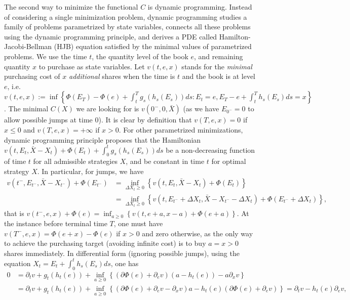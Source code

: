 \documentclass[openany,oneside]{article}
\theoremstyle{definition}
\theoremstyle{remark}
\begin{document}
The second way to minimize the functional $C$ is dynamic programming. Instead of considering a single minimization problem, dynamic programming studies a family of problems parametrized by state variables, connects all these problems using the dynamic programming principle, and derives a PDE called Hamilton-Jacobi-Bellman (HJB) equation satisfied by the minimal values of parametrized problems. We use the time $t$, the quantity level of the book $e$, and remaining quantity $x$ to purchase as state variables. Let $v(t,e,x)$ stands for the \emph{minimal} purchasing cost of $x$ \emph{additional} shares when the time is $t$ and the book is at level $e$, i.e. $v(t,e,x) := \inf \left\{ \Phi(E_T) - \Phi(e) + \int_t^T g_s(h_s(E_s)) ds : E_{t} = e, E_T - e + \int_t^T h_s(E_s) ds = x \right\}$. The minimal $C(X)$ we are looking for is $v({0^-},0,\bar{X})$ (as we have $E_{0^-}=0$ to allow possible jumps at time $0$). It is clear by definition that $v(T,e,x)=0$ if $x\le 0$ and $v(T,e,x)=+\infty$ if $x>0$. For other parametrized minimizations, dynamic programming principle proposes that the Hamiltonian $v(t,E_{t},\bar{X}-X_{t}) + \Phi(E_{t}) + \int_0^t g_s(h_s(E_s)) ds$ be a non-decreasing function of time $t$ for all admissible strategies $X$, and be constant in time $t$ for optimal strategy $X$. In particular, for jumps, we have 
\begin{align*}
v(t^-, E_{t^-}, \bar{X}-X_{t^-}) + \Phi(E_{t^-}) &= \inf_{\Delta X_t \ge 0} \left\{ v(t,E_t,\bar{X}-X_t) + \Phi(E_t) \right\} \\
&= \inf_{\Delta X_t \ge 0} \left\{ v(t, E_{t^-}+\Delta X_t, \bar{X}-X_{t^-}-\Delta X_t) + \Phi(E_{t^-} + \Delta X_t) \right\},
\end{align*}
that is $v(t^-,e,x) + \Phi(e) = \inf_{a\ge 0} \left\{v(t,e+a,x-a) + \Phi(e+a) \right\}$. At the instance before terminal time $T$, one must have $v(T^-,e,x)=\Phi(e+x)-\Phi(e)$ if $x>0$ and zero otherwise, as the only way to achieve the purchasing target (avoiding infinite cost) is to buy $a=x>0$ shares immediately. In differential form (ignoring possible jumps), using the equation $X_t = E_t + \int_0^t h_s(E_s) ds$, one has
\begin{align*}
0 &= \partial_t v + g_t(h_t(e)) + \inf_{a\ge 0} \left\{ (\partial \Phi(e) + \partial_e v) (a-h_t(e)) - a \partial_x v \right\} \\
&= \partial_t v + g_t(h_t(e)) + \inf_{a\ge 0} \left\{ (\partial \Phi(e) + \partial_e v - \partial_x v) a - h_t(e) (\partial \Phi(e) + \partial_e v) \right\} = \partial_t v - h_t(e) \partial_e v,
\end{align*}
\end{document}
